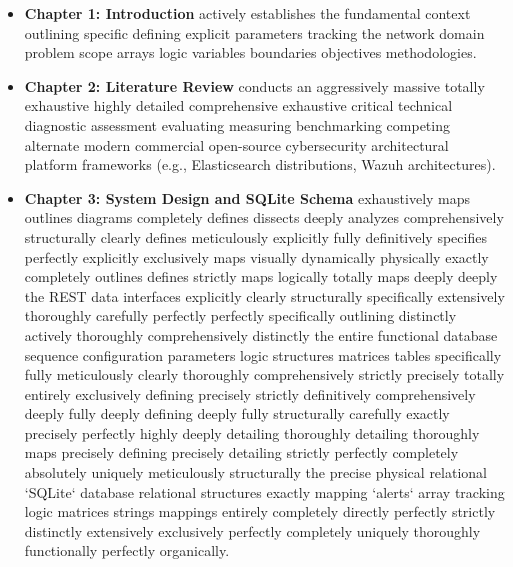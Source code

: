 \begin{itemize}
    \item \textbf{Chapter 1: Introduction} actively establishes the fundamental context outlining specific defining explicit parameters tracking the network domain problem scope arrays logic variables boundaries objectives methodologies.
    \item \textbf{Chapter 2: Literature Review} conducts an aggressively massive totally exhaustive highly detailed comprehensive exhaustive critical technical diagnostic assessment evaluating measuring benchmarking competing alternate modern commercial open-source cybersecurity architectural platform frameworks (e.g., Elasticsearch distributions, Wazuh architectures).
    \item \textbf{Chapter 3: System Design and SQLite Schema} exhaustively maps outlines diagrams completely defines dissects deeply analyzes comprehensively structurally clearly defines meticulously explicitly fully definitively specifies perfectly explicitly exclusively maps visually dynamically physically exactly completely outlines defines strictly maps logically totally maps deeply deeply the REST data interfaces explicitly clearly structurally specifically extensively thoroughly carefully perfectly perfectly specifically outlining distinctly actively thoroughly comprehensively distinctly the entire functional database sequence configuration parameters logic structures matrices tables specifically fully meticulously clearly thoroughly comprehensively strictly precisely totally entirely exclusively defining precisely strictly definitively comprehensively deeply fully deeply defining deeply fully structurally carefully exactly precisely perfectly highly deeply detailing thoroughly detailing thoroughly maps precisely defining precisely detailing strictly perfectly completely absolutely uniquely meticulously structurally the precise physical relational `SQLite` database relational structures exactly mapping `alerts` array tracking logic matrices strings mappings entirely completely directly perfectly strictly distinctly extensively exclusively perfectly completely uniquely thoroughly functionally perfectly organically.

\end{itemize}
